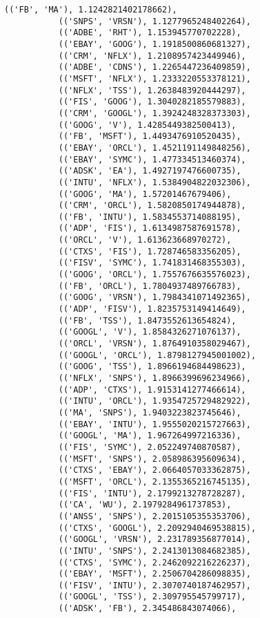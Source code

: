 \documentclass[11pt]{article}
\begin{document}
\begin{Verbatim}[commandchars=\\\{\}]
           (('FB', 'MA'), 1.1242821402178662),
           (('SNPS', 'VRSN'), 1.1277965248402264),
           (('ADBE', 'RHT'), 1.153945770702228),
           (('EBAY', 'GOOG'), 1.1918500860681327),
           (('CRM', 'NFLX'), 1.2108957423449946),
           (('ADBE', 'CDNS'), 1.2265447236409859),
           (('MSFT', 'NFLX'), 1.2333220553378121),
           (('NFLX', 'TSS'), 1.2638483920444297),
           (('FIS', 'GOOG'), 1.3040282185579883),
           (('CRM', 'GOOGL'), 1.3924248328373303),
           (('GOOG', 'V'), 1.4285449382500413),
           (('FB', 'MSFT'), 1.4493476910520435),
           (('EBAY', 'ORCL'), 1.4521191149848256),
           (('EBAY', 'SYMC'), 1.477334513460374),
           (('ADSK', 'EA'), 1.4927197476600735),
           (('INTU', 'NFLX'), 1.5384904822032306),
           (('GOOG', 'MA'), 1.57201467679406),
           (('CRM', 'ORCL'), 1.5820850174944878),
           (('FB', 'INTU'), 1.5834553714088195),
           (('ADP', 'FIS'), 1.6134987587691578),
           (('ORCL', 'V'), 1.613623668970272),
           (('CTXS', 'FIS'), 1.728746583356205),
           (('FISV', 'SYMC'), 1.741831468355303),
           (('GOOG', 'ORCL'), 1.7557676635576023),
           (('FB', 'ORCL'), 1.7804937489766783),
           (('GOOG', 'VRSN'), 1.7984341071492365),
           (('ADP', 'FISV'), 1.8235753149414649),
           (('FB', 'TSS'), 1.8473552613654824),
           (('GOOGL', 'V'), 1.8584326271076137),
           (('ORCL', 'VRSN'), 1.8764910358029467),
           (('GOOGL', 'ORCL'), 1.8798127945001002),
           (('GOOG', 'TSS'), 1.8966194684498623),
           (('NFLX', 'SNPS'), 1.8966399696234966),
           (('ADP', 'CTXS'), 1.9153141277466614),
           (('INTU', 'ORCL'), 1.9354725729482922),
           (('MA', 'SNPS'), 1.9403223823745646),
           (('EBAY', 'INTU'), 1.9555020215727663),
           (('GOOGL', 'MA'), 1.967264997216336),
           (('FIS', 'SYMC'), 2.052249740870587),
           (('MSFT', 'SNPS'), 2.058986395609634),
           (('CTXS', 'EBAY'), 2.0664057033362875),
           (('MSFT', 'ORCL'), 2.1355365216745135),
           (('FIS', 'INTU'), 2.1799213278728287),
           (('CA', 'WU'), 2.1979284961737853),
           (('ANSS', 'SNPS'), 2.2015105355353706),
           (('CTXS', 'GOOGL'), 2.2092940469538815),
           (('GOOGL', 'VRSN'), 2.231789356877014),
           (('INTU', 'SNPS'), 2.2413013084682385),
           (('CTXS', 'SYMC'), 2.2462092216226237),
           (('EBAY', 'MSFT'), 2.2506704286098835),
           (('FISV', 'INTU'), 2.3070740187462957),
           (('GOOGL', 'TSS'), 2.309795545799717),
           (('ADSK', 'FB'), 2.345486843074066),

\end{Verbatim}
\end{document}
